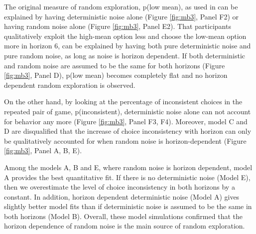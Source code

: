 \documentclass[12pt]{article}
\begin{document}
	The original measure of random exploration, p(low mean), as used in \cite{wilson2014} can be explained by having deterministic noise alone (Figure \ref{fig:mb3}, Panel F2) or having random noise alone (Figure \ref{fig:mb3}, Panel E2). That participants qualitatively exploit the high-mean option less and choose the low-mean option more in horizon 6, can be explained by having both pure deterministic noise and pure random noise, as long as noise is horizon dependent. If both deterministic and random noise are assumed to be the same for both horizons (Figure \ref{fig:mb3}, Panel D), p(low mean) becomes completely flat and no horizon dependent random exploration is observed.
	
	On the other hand, by looking at the percentage of inconsistent choices in the repeated pair of game, p(inconsistent), deterministic noise alone can not account for behavior any more (Figure \ref{fig:mb3}, Panel F3, F4). Moreover, model C and D are disqualified that the increase of choice inconsistency with horizon can only be qualitatively accounted for when random noise is horizon-dependent (Figure \ref{fig:mb3}, Panel A, B, E).
	
	Among the models A, B and E, where random noise is horizon dependent, model A provides the best quantitative fit. If there is no deterministic noise (Model E), then we overestimate the level of choice inconsistency in both horizons by a constant. In addition, horizon dependent deterministic noise (Model A) gives slightly better model fits than if deterministic noise is assumed to be the same in both horizons (Model B). Overall, these model simulations confirmed that the horizon dependence of random noise is the main source of random exploration.
	
\end{document}
